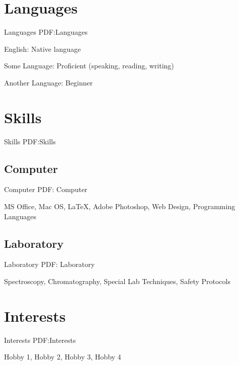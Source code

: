 \documentclass[letterpaper,9pt,oneside]{article}
\begin{document}
\begin{body}
\section
{Languages}
{Languages}
{PDF:Languages}

English: Native language 
\par
Some Language: Proficient (speaking, reading, writing)
\par
Another Language: Beginner



\section
{Skills}
{Skills}
{PDF:Skills}

\subsection
{Computer}
{Computer}
{PDF: Computer}

MS Office, Mac OS, {\LaTeX}, Adobe Photoshop, Web Design, Programming Languages 

\EntryGap
\subsection
{Laboratory}
{Laboratory}
{PDF: Laboratory}

Spectroscopy, Chromatography, Special Lab Techniques, Safety Protocols 


\section
{Interests}
{Interests}
{PDF:Interests}

Hobby 1, Hobby 2, Hobby 3, Hobby 4





\end{body}
\end{document}
